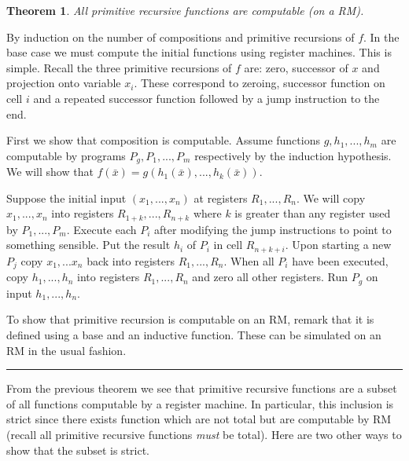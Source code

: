 \documentclass[twoside]{article}
\newcounter{lecnum}
\newtheorem{theorem}{Theorem}[lecnum]
\newenvironment{proof}{{\bf Proof:}}{\hfill\rule{2mm}{2mm}}
\begin{document}
\begin{theorem}
All primitive recursive functions are computable (on a RM).
\end{theorem}
\begin{proof}
By induction on the number of compositions and primitive recursions of $f$. In the base case we must compute the initial functions using register machines. This is simple. Recall the three primitive recursions of $f$ are: zero, successor of $x$ and projection onto variable $x_i$. These correspond to zeroing, successor function on cell $i$ and a repeated successor function followed by a jump instruction to the end.  

First we show that composition is computable. Assume functions $g, h_1, ..., h_m$ are computable by programs $P_g, P_1, ..., P_m$ respectively by the induction hypothesis. We will show that $f(\bar{x}) = g(h_1(\bar{x}), ..., h_k(\bar{x}))$. 

Suppose the initial input $(x_1, ..., x_n)$ at registers $R_1, ..., R_n$. We will copy $x_1, ..., x_n$ into registers $R_{1+k}, ..., R_{n+k}$ where $k$ is greater than any register used by $P_1, ..., P_m$. Execute each $P_i$ after modifying the jump instructions to point to something sensible. Put the result $h_i$ of $P_i$ in cell $R_{n+k+i}$. Upon starting a new $P_j$ copy $x_1,... x_n$ back into registers $R_1, ..., R_n$. When all $P_i$ have been executed, copy $h_1,..., h_n$ into registers $R_1, ..., R_n$ and zero all other registers. Run $P_g$ on input $h_1, ..., h_n$. 

To show that primitive recursion is computable on an RM, remark that it is defined using a base and an inductive function. These can be simulated on an RM in the usual fashion.   
\end{proof}

From the previous theorem we see that primitive recursive functions are a subset of all functions computable by a register machine. In particular, this inclusion is strict since there exists function which are not total but are computable by RM (recall all primitive recursive functions \emph{must} be total). Here are two other ways to show that the subset is strict.
\end{document}
